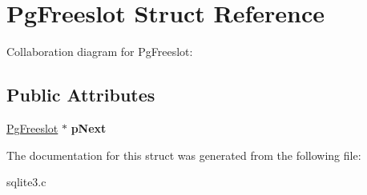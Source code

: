 \hypertarget{structPgFreeslot}{}\section{Pg\+Freeslot Struct Reference}
\label{structPgFreeslot}


Collaboration diagram for Pg\+Freeslot\+:
\subsection*{Public Attributes}
\begin{DoxyCompactItemize}
\item 
\hyperlink{structPgFreeslot}{Pg\+Freeslot} $\ast$ {\bfseries p\+Next}\hypertarget{structPgFreeslot_ac38a6e51f86c650fb943585d7b6c8b70}{}\label{structPgFreeslot_ac38a6e51f86c650fb943585d7b6c8b70}

\end{DoxyCompactItemize}


The documentation for this struct was generated from the following file\+:\begin{DoxyCompactItemize}
\item 
sqlite3.\+c\end{DoxyCompactItemize}
